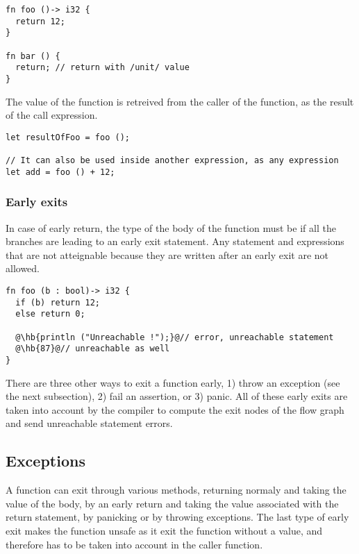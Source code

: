 \begin{lstlisting}[style=coloredverbatim]
fn foo ()-> i32 {
  return 12;
}

fn bar () {
  return; // return with /unit/ value
}
\end{lstlisting}

The value of the function is retreived from the caller of the function, as the
result of the call expression.

\begin{lstlisting}[style=coloredverbatim]
let resultOfFoo = foo ();

// It can also be used inside another expression, as any expression
let add = foo () + 12;
\end{lstlisting}

\subsubsection*{Early exits}
\label{sec:function_early_return}

In case of early return, the type of the body of the function must be
 if all the branches are leading to an early exit statement. Any
statement and expressions that are not atteignable because they are written
after an early exit are not allowed.

\begin{lstlisting}[style=coloredverbatim, escapechar=@]
fn foo (b : bool)-> i32 {
  if (b) return 12;
  else return 0;

  @\hb{println ("Unreachable !");}@// error, unreachable statement
  @\hb{87}@// unreachable as well
}
\end{lstlisting}

There are three other ways to exit a function early, 1) throw an exception (see
the next subsection), 2) fail an assertion, or 3) panic. All of these early
exits are taken into account by the compiler to compute the exit nodes of the
flow graph and send unreachable statement errors.

\subsection {Exceptions}

A function can exit through various methods, returning normaly and taking the
value of the body, by an early return and taking the value associated with the
return statement, by panicking or by throwing exceptions. The last type of early
exit makes the function unsafe as it exit the function without a value, and
therefore has to be taken into account in the caller function.

